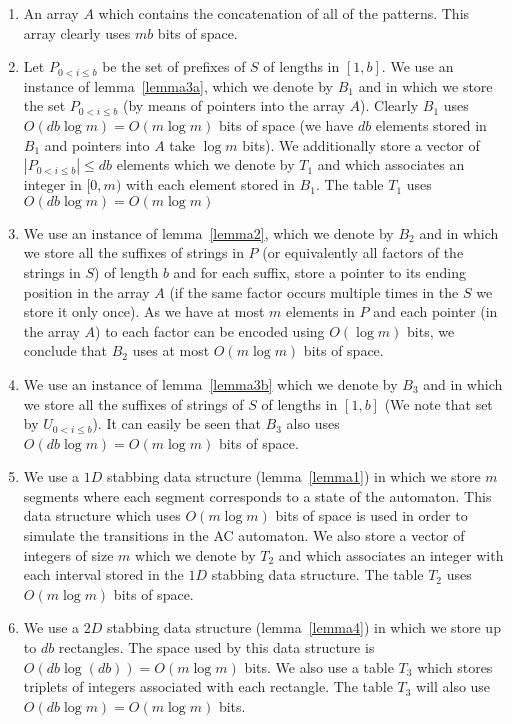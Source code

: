 \documentclass{article}
\newcommand{\?}{\mskip1.5mu}
\begin{document}
\begin{enumerate}
\item An array $A$ which contains the concatenation of all of the patterns. This array clearly uses $mb$ bits of space.
\item Let $P_{0<i\leq b}$ be the set of prefixes of $S$ of lengths in $[1,b]$. We use an instance of lemma~\ref{lemma3a}, which we denote by $B_1$ and in which we store the set $P_{0<i\leq b}$ (by means of pointers into the array $A$). Clearly $B_1$ uses $O(db\log m)=O(m\log m)$ bits of space (we have $db$ elements stored in $B_1$ and pointers into $A$ take $\log m$ bits). We additionally store a vector of $|P_{0<i\leq b}|\leq db$ elements which we denote by $T_1$ and which associates an integer in $[0,m)$ with each element stored in $B_1$. The table $T_1$ uses $O(db\log m)=O(m\log m)$


\item We use an instance of lemma~\ref{lemma2}, which we denote by $B_2$ and in which we store all the suffixes of strings in $P$ (or equivalently all factors of the strings in $S$) of length $b$ and for each suffix, store a pointer to its ending position in the array $A$ (if the same factor occurs multiple times in the $S$ we store it only once). As we have at most $m$ elements in $P$ and each pointer (in the array $A$) to each factor can be encoded using $O(\log m)$ bits, we conclude that $B_2$ uses at most $O(m\log m)$ bits of space. 
\item We use an instance of lemma~\ref{lemma3b} which we denote by $B_3$ and in which we store all the suffixes of strings of $S$ of lengths in $[1,b]$ (We note that set by $U_{0<i\leq b}$). It can easily be seen that $B_3$ also uses $O(db\log m)=O(m\log m)$ bits of space. 
\item We use a $1D$ stabbing data structure (lemma~\ref{lemma1}) in which we store $m$ segments where each segment corresponds to a state of the automaton. This data structure which uses $O(m\log m)$ bits of space is used in order to simulate the transitions in the AC automaton. 
We also store a vector of integers of size $m$ which we denote by $T_2$ and which associates an integer with each interval stored in the $1D$ stabbing data structure. The table $T_2$ uses $O(m\log m)$ bits of space.
\item We use a $2D$ stabbing data structure (lemma~\ref{lemma4}) in which we store up to $db$ rectangles. The space used by this data structure is $O(db\log (db))=O(m\log m)$ bits. We also use a table $T_3$ which stores triplets of integers associated with each rectangle. The table $T_3$ will also use $O(db\log m)=O(m\log m)$ bits. 


\end{enumerate}
\end{document}
